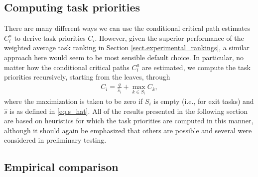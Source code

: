 \documentclass[12pt]{article}
\begin{document}
\subsection{Computing task priorities}
\label{subsect.ps_priorities}

There are many different ways we can use the conditional critical path estimates $C_i^a$ to derive task priorities $C_i$. However, given the superior performance of the weighted average task ranking in Section \ref{sect.experimental_rankings}, a similar approach here would seem to be most sensible default choice. In particular, no matter how the conditional critical paths $C_i^a$ are estimated, we compute the task priorities recursively, starting from the leaves, through 
\begin{align}
C_i = \frac{q}{\hat{s}_i} + \max_{k \in S_i} C_k, \label{eq.alt_prios}
\end{align}  
where the maximization is taken to be zero if $S_i$ is empty (i.e., for exit tasks) and $\hat{s}$ is as defined in \eqref{eq.s_hat}. All of the results presented in the following section are based on heuristics for which the task priorities are computed in this manner, although it should again be emphasized that others are possible and several were considered in preliminary testing. 


\subsection{Empirical comparison}
\label{subsect.processor_selection_results}
\end{document}
